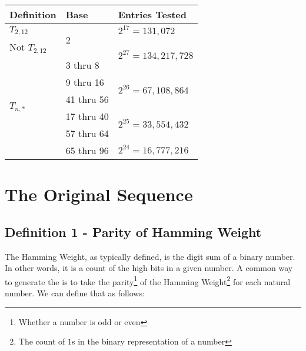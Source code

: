 \documentclass[conference]{IEEEtran}
\begin{document}
\renewcommand{\arraystretch}{1.25}
\begin{table}[H]
\centering
\begin{tabular}{|l|l|l|}
\hline
\textbf{Definition}       &\textbf{Base}     &\textbf{Entries Tested}              \\ \hline
$T_{2,12}$                &\multirow{2}{*}{2}& $2^{17} = 131,072$                  \\ \cline{1-1}\cline{3-3} 
Not $T_{2,12}$            &                  &\multirow{2}{*}{$2^{27}=134,217,728$}\\ \cline{1-2}
\multirow{6}{*}{$T_{n,*}$}&3 thru 8          &                                     \\ \cline{2-3} 
                          &9 thru 16         &\multirow{2}{*}{$2^{26}=67,108,864$} \\ \cline{2-2}
                          &41 thru 56        &                                     \\ \cline{2-3} 
                          &17 thru 40        &\multirow{2}{*}{$2^{25}=33,554,432$} \\ \cline{2-2}
                          &57 thru 64        &                                     \\ \cline{2-3} 
                          &65 thru 96        & $2^{24} = 16,777,216$               \\ \hline
\end{tabular}
\end{table}
\renewcommand{\arraystretch}{1}

\section{The Original Sequence}

\subsection{Definition 1 - Parity of Hamming Weight}


The Hamming Weight, as typically defined, is the digit sum of a binary number. In other words, it is a count of the high bits in a given number. A common way to generate the \TMS is to take the parity\footnote{Whether a number is odd or even} of the Hamming Weight\footnote{The count of $1$s in the binary representation of a number} for each natural number. We can define that as follows:
\end{document}
